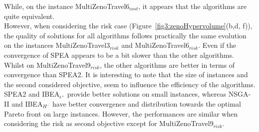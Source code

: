 \documentclass{llncs}
\begin{document}
While, on the instance MultiZenoTravel6$_{cost}$, it appears that the algorithms  are quite equivalent.\\
However, when considering the risk case (Figure~\ref{fig3:zenoHypervolume}(b,d, f)), the quality of solutions  for all algorithms 
follows practically the same evolution on the instances  MultiZenoTravel3$_{risk}$ and  MultiZenoTravel6$_{risk}$. 
Even if the  convergence of SPEA appears to be a bit slower than the other algorithms.
Whilst on MultiZenoTravel9$_{risk}$, the other algorithms are better in terms of convergence than SPEA2.
It is interesting to note that the size of instances  and the  second considered objective, seem to  influence the efficiency of the algorithms.
SPEA2 and IBEA$_{\epsilon^+}$  provide  better solutions on small instances,  whereas NSGA-II and IBEA$_{H^-}$ have better convergence and distribution  towards the optimal Pareto front on 
large instances. However, the performances are similar when considering the risk as second objective except for MultiZenoTravel9$_{risk}$.
\end{document}
